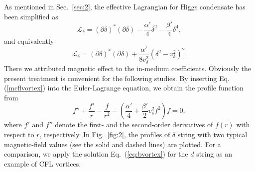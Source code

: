 \documentclass[12pt]{article}
\begin{document}
As mentioned in Sec.~\ref{sec:2}, the effective Lagrangian for Higgs condensate has been simplified as 
\begin{equation}
\label{eq:mcflvorticehamilton}
 \mathcal{L}_\delta = (\partial \delta)^* (\partial \delta) - \frac{\alpha'}{4}\delta^2 - \frac{\beta'}{4}\delta^4,
\end{equation}
and equivalently
\begin{equation}
  \label{eq:vortond}
  \mathcal{L}_\delta = (\partial \delta)^* (\partial \delta) + \frac{\alpha'}{8 v_\delta^2}(\delta^2 - v_\delta^2)^2.
\end{equation}
There we attributed magnetic effect to the in-medium coefficients.
Obviously the present treatment is convenient for the following studies.
By inserting Eq.(\ref{mcflvortex}) into the Euler-Lagrange equation, we obtain the profile function from
\begin{equation}
\label{eq:profilefunction}
 f'' + \frac{f'}{r} -\frac{f}{r^2} - (\frac{\alpha'}{4} + \frac{\beta'}{2} v_\delta^2 f^2)f=0,
\end{equation}
where $f'$ and $f''$ denote the first- and the second-order derivatives of $f(r)$ with respect to $r$,
respectively. 
In Fig.~\ref{fig:2}, the profiles of $\delta$ string with two typical magnetic-field values (see the
solid and dashed lines) are plotted. 
For a comparison, we apply the solution Eq.~(\ref{eq:bvortex}) for the $d$ string 
as an example of CFL vortices.
\end{document}
